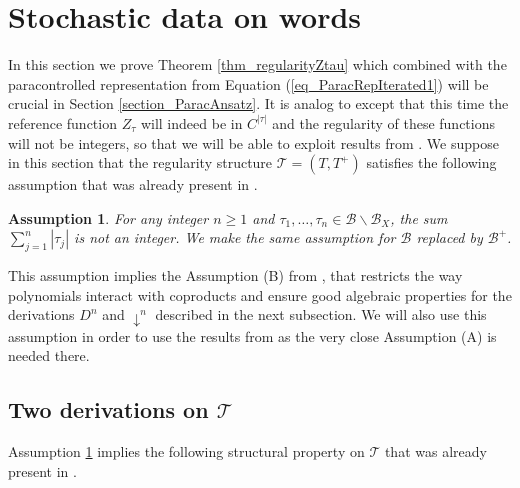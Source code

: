 \documentclass[11pt]{preprint}
\newcommand{\mcB}{\mathcal{B}}
\newcounter{theorem}
\newtheorem{assumption}{Assumption}
\def\eqref#1{(\ref{#1})}
\newcommand{\scrT}{\mathscr{T}}
\begin{document}
	
	
	\section{Stochastic data on words \label{section_fromRStoPS}}
	
	In this section we prove Theorem \ref{thm_regularityZtau} which combined with the paracontrolled representation from Equation \eqref{eq_ParacRepIterated1} will be crucial in Section \ref{section_ParacAnsatz}. It is analog to \cite[Theorem 1]{BailleulHoshinoRS1} except that this time the reference function $Z_\tau$ will indeed be in $C^{|\tau|}$ and the regularity of these functions will not be integers, so that we will be able to exploit results from \cite{LocalExpansionsParacSystems}.
	We suppose in this section that the  regularity structure $\scrT=(T,T^+)$  satisfies the following assumption that was already present in \cite{PCandRS2}. 
	\begin{assumption}\label{assumption_notint}
		For any integer $n\geq 1$ and $\tau_1,\dots,\tau_n \in \mcB\backslash \mcB_X$, the sum $\sum_{j=1}^n |\tau_j|$ is not an integer. We make the same assumption for $ \mcB $ replaced by $\mcB^+$.
	\end{assumption}
	This assumption implies the Assumption (B) from \cite{PCandRS2}, that restricts the way polynomials interact with coproducts and ensure good algebraic properties for the derivations $D^n$ and $\downarrow^n$ described in the next subsection. We will also use this assumption in order to use the results from \cite{LocalExpansionsParacSystems} as the very close Assumption (A) is needed there.
	
	
	
	
	
	
	
	\subsection{Two derivations on $\scrT$ \ }
	\label{section_derivations}
	Assumption \ref{assumption_notint} implies the following structural property on $\scrT$ that was already present in \cite{PCandRS2}.
	
\end{document}
